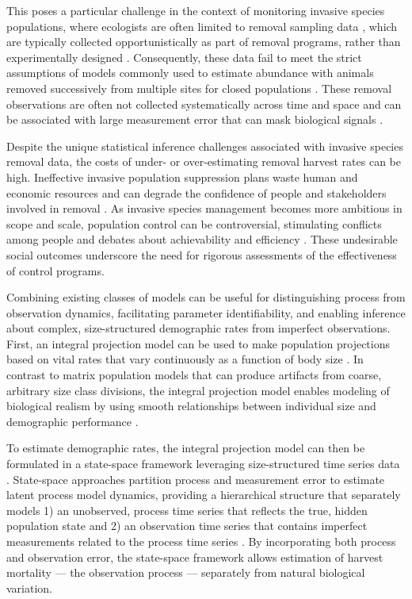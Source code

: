 \documentclass{article}
\begin{document}
This poses a particular challenge in the context of monitoring invasive species populations, where ecologists are often limited to removal sampling data \parencite{udell2022open}, which are typically collected opportunistically as part of removal programs, rather than experimentally designed \parencite{tiberti2021alien, crall2010improving, rogosch2021comparing}. Consequently, these data fail to meet the strict assumptions of models commonly used to estimate abundance with animals removed successively from multiple sites for closed populations \parencite{dorazio2005improving}. These removal observations are often not collected systematically across time and space and can be associated with large measurement error that can mask biological signals \parencite{auger2016state, sibert2003horizontal, katsanevakis2012monitoring}.

Despite the unique statistical inference challenges associated with invasive species removal data, the costs of under- or over-estimating removal harvest rates can be high. Ineffective invasive population suppression plans waste human and economic resources and can degrade the confidence of people and stakeholders involved in removal \parencite{tiberti2021alien}. As invasive species management becomes more ambitious in scope and scale, population control can be controversial, stimulating conflicts among people and debates about achievability and efficiency \parencite{crowley2017conflict}. These undesirable social outcomes underscore the need for rigorous assessments of the effectiveness of control programs.

Combining existing classes of models can be useful for distinguishing process from observation dynamics, facilitating parameter identifiability, and enabling inference about complex, size-structured demographic rates from imperfect observations. First, an integral projection model can be used to make population projections based on vital rates that vary continuously as a function of body size \parencite{merow2014advancing, rees2014building}. In contrast to matrix population models that can produce artifacts from coarse, arbitrary size class divisions, the integral projection model enables modeling of biological realism by using smooth relationships between individual size and demographic performance \parencite{ellner2006integral}. 

To estimate demographic rates, the integral projection model can then be formulated in a state-space framework leveraging size-structured time series data \parencite{white2016fitting}. State-space approaches partition process and measurement error to estimate latent process model dynamics, providing a hierarchical structure that separately models 1) an unobserved, process time series that reflects the true, hidden population state and 2) an observation time series that contains imperfect measurements related to the process time series \parencite{auger2021guide, newman2006hidden}. By incorporating both process and observation error, the state-space framework allows estimation of harvest mortality — the observation process — separately from natural biological variation.
\end{document}
